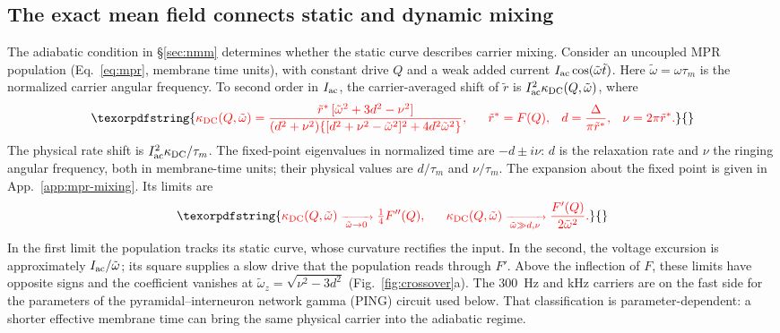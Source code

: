 \documentclass[11pt,a4paper]{article}
\providecommand{\DIFdeltex}[1]{{\protect\color{red} \scriptsize #1}} %
\providecommand{\DIFdel}[1]{\texorpdfstring{\DIFdeltex{#1}}{}} %
\begin{document}
\subsection{\DIFdel{The exact mean field connects static and dynamic mixing}}%
\addtocounter{subsection}{-1}%
\DIFdel{The adiabatic condition in \S\ref{sec:nmm} determines whether the static curve describes
carrier mixing. Consider an uncoupled MPR population (Eq.~\eqref{eq:mpr}, membrane
time units), with constant drive $Q$ and a weak added current $I_{\rm ac}\cos(\tilde\omega\tilde t)$.
Here $\tilde\omega=\omega\tau_m$ is the normalized carrier angular frequency.
To second order in $I_{\rm ac}$, the carrier-averaged shift of $\tilde r$ is $I_{\rm ac}^2\kappa_{\rm DC}(Q,\tilde\omega)$, where
}\begin{displaymath}
\DIFdel{\kappa_{\rm DC}(Q,\tilde\omega)=\frac{\tilde r^*\,[\tilde\omega^2+3d^2-\nu^2]}{(d^2+\nu^2)\{[d^2+\nu^2-\tilde\omega^2]^2+4d^2\tilde\omega^2\}},
\qquad \tilde r^*=F(Q),\quad d=\frac{\Delta}{\pi \tilde r^*},\quad \nu=2\pi \tilde r^*.
}\end{displaymath}%
\DIFdel{The physical rate shift is $I_{\rm ac}^2\kappa_{\rm DC}/\tau_m$.
The fixed-point eigenvalues in normalized time are $-d\pm i\nu$: $d$ is the relaxation rate and $\nu$
the ringing angular frequency, both in membrane-time units; their physical
values are $d/\tau_m$ and $\nu/\tau_m$. The expansion about the fixed point is given in
App.~\ref{app:mpr-mixing}. Its limits are
}\begin{displaymath}
\DIFdel{\kappa_{\rm DC}(Q,\tilde\omega)\xrightarrow[\ \tilde\omega\to0\ ]{}\tfrac14F''(Q),\qquad
\kappa_{\rm DC}(Q,\tilde\omega)\xrightarrow[\ \tilde\omega\gg d,\nu\ ]{}\frac{F'(Q)}{2\tilde\omega^2}.
}\end{displaymath}%
\DIFdel{In the first limit the population tracks its static curve, whose curvature rectifies
the input. In the second, the voltage excursion is approximately $I_{\rm ac}/\tilde\omega$; its
square supplies a slow drive that the population reads through $F'$. Above the
inflection of $F$, these limits have opposite signs and the coefficient vanishes at
$\tilde\omega_z=\sqrt{\nu^2-3d^2}$ (Fig.~\ref{fig:crossover}a). The $300$~Hz and kHz carriers
are on the fast side for the parameters of the pyramidal--interneuron network gamma
(PING) circuit used below. That classification is
parameter-dependent: a shorter effective membrane time can bring the same physical
carrier into the adiabatic regime.
}%
\end{document}
